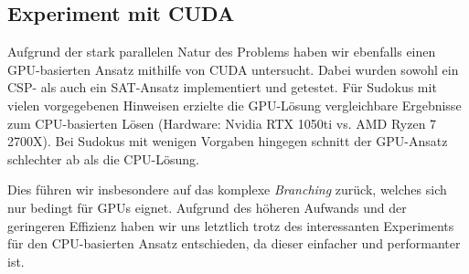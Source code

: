 \subsection{Experiment mit CUDA}

Aufgrund der stark parallelen Natur des Problems haben wir ebenfalls einen GPU-basierten Ansatz mithilfe von CUDA untersucht. Dabei wurden sowohl ein CSP- als auch ein SAT-Ansatz implementiert und getestet.  
Für Sudokus mit vielen vorgegebenen Hinweisen erzielte die GPU-Lösung vergleichbare Ergebnisse zum CPU-basierten Lösen (Hardware: Nvidia RTX 1050ti vs. AMD Ryzen 7 2700X). Bei Sudokus mit wenigen Vorgaben hingegen schnitt der GPU-Ansatz schlechter ab als die CPU-Lösung.  

Dies führen wir insbesondere auf das komplexe \emph{Branching} zurück, welches sich nur bedingt für GPUs eignet. Aufgrund des höheren Aufwands und der geringeren Effizienz haben wir uns letztlich trotz des interessanten Experiments für den CPU-basierten Ansatz entschieden, da dieser einfacher und performanter ist.